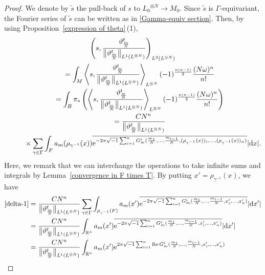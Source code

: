 \documentclass[10pt,a4paper]{amsart}
\numberwithin{equation}{section}
\newcommand{\R}{\mathbb{R}}
\renewcommand{\tilde}{\widetilde}
\newcommand{\abs}[1]{\lvert#1\rvert}
\def\re{\operatorname{Re}}
\begin{document}
\begin{proof}
We denote by ${\tilde s}$ the pull-back of $s$ to ${L_0}^{\otimes N}\to M_0$. Since ${\tilde s}$ is $\Gamma$-equivariant, the Fourier series of ${\tilde s}$ can be written as in \eqref{Gamma-equiv section}. Then, by using Proposition~\ref{expression of theta}\,(1),
\begin{gather}
\left( s, \frac{\vartheta^t_{\frac{m}{N}}}{\big\|\vartheta^t_{\frac{m}{N}}\big\|_{L^1(L^{\otimes N})}} \right)_{L^2(L^{\otimes N})}\nonumber \\
\qquad=\int_M\left\langle s, \frac{\vartheta^t_{\frac{m}{N}}}{\big\|\vartheta^t_{\frac{m}{N}}\big\|_{L^1(L^{\otimes N})}} \right\rangle_{L^{\otimes N}} (-1)^{\frac{n(n-1)}{2}}\dfrac{( N\omega)^n}{n!}\nonumber\\
\qquad=\int_B\pi_*\left(\left\langle s, \frac{\vartheta^t_{\frac{m}{N}}}{\big\|\vartheta^t_{\frac{m}{N}}\big\|_{L^1(L^{\otimes N})}} \right\rangle_{L^{\otimes N}} (-1)^{\frac{n(n-1)}{2}}\dfrac{( N\omega)^n}{n!}\right)\nonumber\\
\qquad= \frac{CN^n}{\big\|\vartheta^t_{\frac{m}{N}}\big\|_{L^1(L^{\otimes N})}}\nonumber\\
\phantom{\qquad=}{} \times \sum_{\gamma \in \Gamma}\int_F a_m(\rho_{\gamma^{-1}}(x))\overline{{\rm e}^{-2\pi\sqrt{-1}\sum_{i=1}^n G_m^i(\frac{m_1}{N},\ldots ,\frac{m_{i-1}}{N},(\rho_{\gamma^{-1}}(x))_i,\ldots ,(\rho_{\gamma^{-1}}(x))_n)}}\abs{{\rm d}x}.\label{delta-1}
\end{gather}
Here, we remark that we can interchange the operations to take infinite sums and integrals by Lemma~\ref{convergence in F times T}. By putting $x'=\rho_{\gamma^{-1}}(x)$, we have
\begin{align}
\eqref{delta-1}={}&\frac{CN^n}{\big\|\vartheta^t_{\frac{m}{N}}\big\|_{L^1(L^{\otimes N})}} \sum_{\gamma \in \Gamma}\int_{\rho_{\gamma^{-1}}(F)} a_m(x')\overline{{\rm e}^{-2\pi\sqrt{-1}\sum_{i=1}^n G_m^i(\frac{m_1}{N},\ldots ,\frac{m_{i-1}}{N},x'_i,\ldots ,x'_n)}}\abs{{\rm d}x'}\nonumber \\
={}&\frac{CN^n}{\big\|\vartheta^t_{\frac{m}{N}}\big\|_{L^1(L^{\otimes N})}}\int_{\R^n} a_m(x')\overline{{\rm e}^{-2\pi\sqrt{-1}\sum_{i=1}^n G_m^i(\frac{m_1}{N},\ldots ,\frac{m_{i-1}}{N},x'_i,\ldots ,x'_n)}}\abs{{\rm d}x'}\nonumber \\
={}&\frac{CN^n}{\big\|\vartheta^t_{\frac{m}{N}}\big\|_{L^1(L^{\otimes N})}}
\int_{\R^n} a_m(x'){\rm e}^{2\pi\sqrt{-1}\sum_{i=1}^n \re G_m^i(\frac{m_1}{N},\ldots ,\frac{m_{i-1}}{N},x'_i,\ldots ,x'_n)}\nonumber \\

\end{align}
\end{proof}
\end{document}
